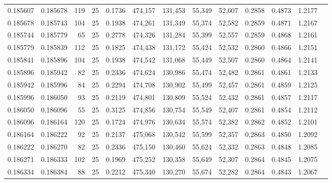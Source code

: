 \begin{tabular}{rrrrrrrrrrrrr}
0.185607 & 0.185678 &   119 &  25 &                                     0.1736 & 474,157 & 131,453 &  55,349 &  52,607 & 0.2858 & 0.4873 & 1.2177 \\
0.185678 & 0.185743 &   104 &  25 &                                     0.1938 & 474,261 & 131,349 &  55,374 &  52,582 & 0.2859 & 0.4871 & 1.2167 \\
0.185744 & 0.185779 &    65 &  25 &                                     0.2778 & 474,326 & 131,284 &  55,399 &  52,557 & 0.2859 & 0.4868 & 1.2161 \\
0.185779 & 0.185839 &   112 &  25 &                                     0.1825 & 474,438 & 131,172 &  55,424 &  52,532 & 0.2860 & 0.4866 & 1.2151 \\
0.185841 & 0.185896 &   104 &  25 &                                     0.1938 & 474,542 & 131,068 &  55,449 &  52,507 & 0.2860 & 0.4864 & 1.2141 \\
0.185896 & 0.185942 &    82 &  25 &                                     0.2336 & 474,624 & 130,986 &  55,474 &  52,482 & 0.2861 & 0.4861 & 1.2133 \\
0.185942 & 0.185996 &    84 &  25 &                                     0.2294 & 474,708 & 130,902 &  55,499 &  52,457 & 0.2861 & 0.4859 & 1.2125 \\
0.185996 & 0.186050 &    93 &  25 &                                     0.2119 & 474,801 & 130,809 &  55,524 &  52,432 & 0.2861 & 0.4857 & 1.2117 \\
0.186050 & 0.186096 &    55 &  25 &                                     0.3125 & 474,856 & 130,754 &  55,549 &  52,407 & 0.2861 & 0.4854 & 1.2112 \\
0.186096 & 0.186164 &   120 &  25 &                                     0.1724 & 474,976 & 130,634 &  55,574 &  52,382 & 0.2862 & 0.4852 & 1.2101 \\
0.186164 & 0.186222 &    92 &  25 &                                     0.2137 & 475,068 & 130,542 &  55,599 &  52,357 & 0.2863 & 0.4850 & 1.2092 \\
0.186222 & 0.186270 &    82 &  25 &                                     0.2336 & 475,150 & 130,460 &  55,624 &  52,332 & 0.2863 & 0.4848 & 1.2085 \\
0.186271 & 0.186333 &   102 &  25 &                                     0.1969 & 475,252 & 130,358 &  55,649 &  52,307 & 0.2864 & 0.4845 & 1.2075 \\
0.186334 & 0.186384 &    88 &  25 &                                     0.2212 & 475,340 & 130,270 &  55,674 &  52,282 & 0.2864 & 0.4843 & 1.2067 \\

\end{tabular}
